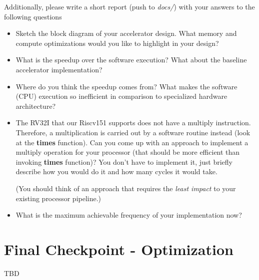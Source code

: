 \documentclass[11pt]{article}
\begin{document}
Additionally, please write a short report (push to \textit{docs/}) with your answers to the following questions
\begin{itemize}
\item Sketch the block diagram of your accelerator design. What memory and compute optimizations would you like to highlight in your design?
\item What is the speedup over the software execution? What about the baseline accelerator implementation?
\item Where do you think the speedup comes from? What makes the software (CPU) execution so inefficient in comparison to specialized hardware architecture?
\item The RV32I that our Riscv151 supports does not have a multiply instruction. Therefore, a multiplication is carried out by a software routine instead (look at the \textbf{times} function). Can you come up with an approach to implement a multiply operation for your processor (that should be more efficient than invoking \textbf{times} function)? You don't have to implement it, just briefly describe how you would do it and how many cycles it would take.

(You should think of an approach that requires the \textit{least impact} to your existing processor pipeline.)
\item What is the maximum achievable frequency of your implementation now?
\end{itemize}

\newpage
\section{Final Checkpoint - Optimization}
TBD
\end{document}
